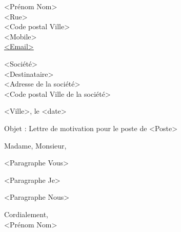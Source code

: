 \documentclass[11pt,a4paper]{article}
\newlength{\decalage}\setlength{\decalage}{0.55\textwidth}
\begin{document}
<Prénom Nom>\\
<Rue>\\
<Code postal Ville>\\
<Mobile>\\
\href{mailto:<Email>}{<Email>}

\vspace{\parskip}
\hspace*{\decalage}\begin{minipage}[t]{\dimexpr\textwidth-\decalage\relax}
<Société>\\
<Destinataire>\\
<Adresse de la société>\\
<Code postal Ville de la société>
\end{minipage}

\vspace{2\parskip}
\hspace*{\decalage}<Ville>, le <date>

\vspace{2\parskip}
Objet : Lettre de motivation pour le poste de <Poste>

\vspace{2\parskip}
Madame, Monsieur,

<Paragraphe Vous>

<Paragraphe Je>

<Paragraphe Nous>

Cordialement,\\
<Prénom Nom>
\end{document}
